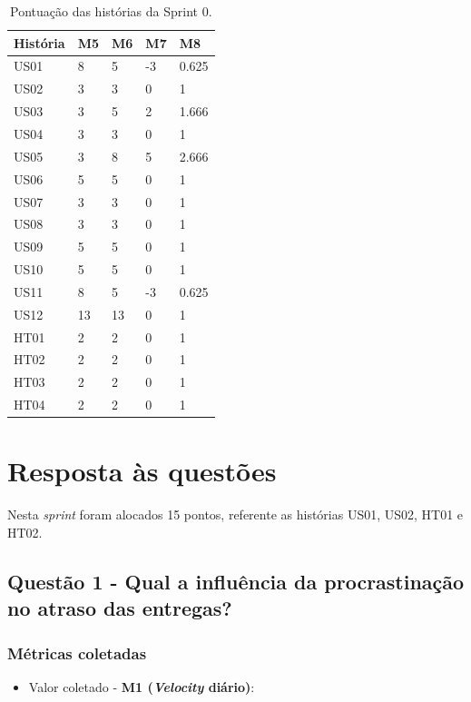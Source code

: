 \begin{apendicesenv}
	\begin{table}
	\centering
	\caption{Pontuação das histórias da Sprint 0.}
	\label{pontuacao_historias}
	\begin{tabular}{ | l | l | l | l | l | }
	\hline
	História & M5 & M6 & M7 & M8 \\ \hline
	US01 & 8 & 5 & -3 & 0.625 \\ \hline
	US02 & 3 & 3 & 0 & 1 \\ \hline
	US03 & 3 & 5 & 2 & 1.666 \\ \hline
	US04 & 3 & 3 & 0 & 1 \\ \hline
	US05 & 3 & 8 & 5 & 2.666 \\ \hline
	US06 & 5 & 5 & 0 & 1 \\ \hline
	US07 & 3 & 3 & 0 & 1 \\ \hline
	US08 & 3 & 3 & 0 & 1 \\ \hline
	US09 & 5 & 5 & 0 & 1 \\ \hline
	US10 & 5 & 5 & 0 & 1 \\ \hline
	US11 & 8 & 5 & -3 & 0.625 \\ \hline
	US12 & 13 & 13 & 0 & 1 \\ \hline
	HT01 & 2 & 2 & 0 & 1 \\ \hline
	HT02 & 2 & 2 & 0 & 1 \\ \hline
	HT03 & 2 & 2 & 0 & 1 \\ \hline
	HT04 & 2 & 2 & 0 & 1 \\ \hline
	\end{tabular}
	\end{table}
	
	\vfill
	\pagebreak
	
	\section{Resposta às questões}
	  
	  Nesta \textit{sprint} foram alocados 15 pontos, referente as histórias US01, US02, HT01 e HT02.
	  
	  \subsection*{Questão 1 - Qual a influência da procrastinação no atraso das entregas?}
	    
	    \subsubsection*{Métricas coletadas}
	    \begin{itemize}
	      \item Valor coletado - \textbf{M1 (\textit{Velocity} diário)}:
	    

\end{itemize}
\end{apendicesenv}
